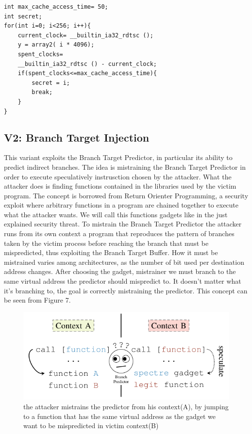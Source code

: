 \begin{Verbatim}[fontsize=\small]
int max_cache_access_time= 50;
int secret;
for(int i=0; i<256; i++){
	current_clock= __builtin_ia32_rdtsc ();
	y = array2( i * 4096);
	spent_clocks=
	__builtin_ia32_rdtsc () - current_clock;
	if(spent_clocks<=max_cache_access_time){
		secret = i;
		break;
	}
}
\end{Verbatim}

\subsection{V2: Branch Target Injection}
This variant exploits the Branch Target Predictor, in particular its ability to predict indirect branches.
The idea is mistraining the Branch Target Predictor in order to execute speculatively instrusction chosen by the attacker.
What the attacker does is finding functions contained in the libraries used by the victim program.
The concept is borrowed from Return Orienter Programming, a security exploit where arbitrary functions in a program are chained together to execute what the attacker wants.
We will call this functions gadgets like in the just explained security threat.
To mistrain the Branch Target Predictor the attacker runs from its own context a program that reproduces the pattern of branches taken by the victim process before reaching the branch that must be mispredicted, thus exploiting the Branch Target Buffer.
How it must be mistrained varies among architectures, as the number of bit used per destination address changes.
After choosing the gadget, mistrainer we must branch to the same virtual address the predictor should mispredict to.
It doesn't matter what it's branching to, the goal is correctly mistraining the predictor.
This concept can be seen from Figure 7.

\begin{figure}[!h]
    \includegraphics[scale=0.4]{img/sv2-mistraining.png}
    \caption{the attacker mistrains the predictor from his context(A), by jumping to a function that has the same virtual address as the gadget we want to be mispredicted in victim context(B)}
\end{figure}


